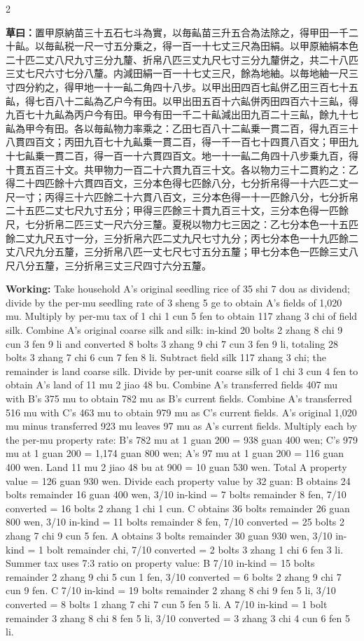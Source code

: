 \documentclass[11pt,a4paper]{article}
\newcommand{\WorkingText}[1]{\par\noindent\textbf{草曰：}#1\par}
\newcommand{\WorkingEn}[1]{\par\noindent\textbf{Working:} #1\par}
\begin{document}
\begin{paracol}{2}
\WorkingText{置甲原納苗三十五石七斗為實，以毎畆苗三升五合為法除之，得甲田一千二十畆。以毎畆税一尺一寸五分乗之，得一百一十七丈三尺為田絹。以甲原紬絹本色二十匹二丈八尺九寸三分九釐、折帛八匹三丈九尺七寸三分九釐併之，共二十八匹三丈七尺六寸七分八釐。内減田絹一百一十七丈三尺，餘為地紬。以毎地紬一尺三寸四分約之，得甲地一十一畆二角四十八步。以甲出田四百七畆併乙田三百七十五畆，得七百八十二畆為乙户今有田。以甲出田五百十六畆併丙田四百六十三畆，得九百七十九畆為丙户今有田。甲今有田一千二十畆減出田九百二十三畆，餘九十七畆為甲今有田。各以毎畆物力率乘之：乙田七百八十二畆乗一貫二百，得九百三十八貫四百文；丙田九百七十九畆乗一貫二百，得一千一百七十四貫八百文；甲田九十七畆乗一貫二百，得一百一十六貫四百文。地一十一畆二角四十八步乗九百，得十貫五百三十文。共甲物力一百二十六貫九百三十文。各以物力三十二貫約之：乙得二十四匹餘十六貫四百文，三分本色得七匹餘八分，七分折帛得一十六匹二丈一尺一寸；丙得三十六匹餘二十六貫八百文，三分本色得一十一匹餘八分，七分折帛二十五匹二丈七尺九寸五分；甲得三匹餘三十貫九百三十文，三分本色得一匹餘尺，七分折帛二匹三丈一尺六分三釐。夏税以物力七三因之：乙七分本色一十五匹餘二丈九尺五寸一分，三分折帛六匹二丈九尺七寸九分；丙七分本色一十九匹餘二丈八尺九分五釐，三分折帛八匹一丈七尺七寸五分五釐；甲七分本色一匹餘三丈八尺八分五釐，三分折帛三丈三尺四寸六分五釐。}
\switchcolumn
\WorkingEn{Take household A's original seedling rice of 35 shi 7 dou as dividend; divide by the per-mu seedling rate of 3 sheng 5 ge to obtain A's fields of 1,020 mu. Multiply by per-mu tax of 1 chi 1 cun 5 fen to obtain 117 zhang 3 chi of field silk. Combine A's original coarse silk and silk: in-kind 20 bolts 2 zhang 8 chi 9 cun 3 fen 9 li and converted 8 bolts 3 zhang 9 chi 7 cun 3 fen 9 li, totaling 28 bolts 3 zhang 7 chi 6 cun 7 fen 8 li. Subtract field silk 117 zhang 3 chi; the remainder is land coarse silk. Divide by per-unit coarse silk of 1 chi 3 cun 4 fen to obtain A's land of 11 mu 2 jiao 48 bu. Combine A's transferred fields 407 mu with B's 375 mu to obtain 782 mu as B's current fields. Combine A's transferred 516 mu with C's 463 mu to obtain 979 mu as C's current fields. A's original 1,020 mu minus transferred 923 mu leaves 97 mu as A's current fields. Multiply each by the per-mu property rate: B's 782 mu at 1 guan 200 = 938 guan 400 wen; C's 979 mu at 1 guan 200 = 1,174 guan 800 wen; A's 97 mu at 1 guan 200 = 116 guan 400 wen. Land 11 mu 2 jiao 48 bu at 900 = 10 guan 530 wen. Total A property value = 126 guan 930 wen. Divide each property value by 32 guan: B obtains 24 bolts remainder 16 guan 400 wen, 3/10 in-kind = 7 bolts remainder 8 fen, 7/10 converted = 16 bolts 2 zhang 1 chi 1 cun. C obtains 36 bolts remainder 26 guan 800 wen, 3/10 in-kind = 11 bolts remainder 8 fen, 7/10 converted = 25 bolts 2 zhang 7 chi 9 cun 5 fen. A obtains 3 bolts remainder 30 guan 930 wen, 3/10 in-kind = 1 bolt remainder chi, 7/10 converted = 2 bolts 3 zhang 1 chi 6 fen 3 li. Summer tax uses 7:3 ratio on property value: B 7/10 in-kind = 15 bolts remainder 2 zhang 9 chi 5 cun 1 fen, 3/10 converted = 6 bolts 2 zhang 9 chi 7 cun 9 fen. C 7/10 in-kind = 19 bolts remainder 2 zhang 8 chi 9 fen 5 li, 3/10 converted = 8 bolts 1 zhang 7 chi 7 cun 5 fen 5 li. A 7/10 in-kind = 1 bolt remainder 3 zhang 8 chi 8 fen 5 li, 3/10 converted = 3 zhang 3 chi 4 cun 6 fen 5 li.}


\end{paracol}
\end{document}

